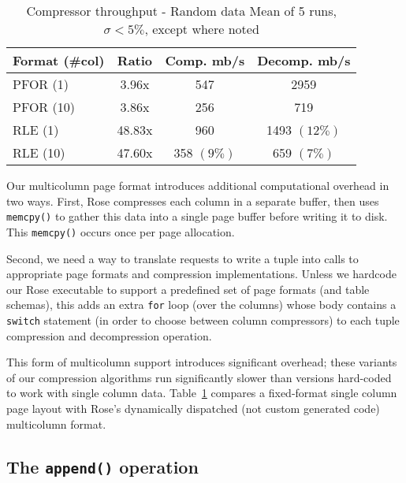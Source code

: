 \documentclass{vldb}
\newcommand{\rows}{Rose\xspace}
\newcommand{\rowss}{Rose's\xspace}
\begin{document}
\begin{table}
\caption{Compressor throughput - Random data Mean of 5 runs, $\sigma<5\%$, except where noted}
\centering
\label{table:perf}
\begin{tabular}{|l|c|c|c|} \hline
Format (\#col)    & Ratio & Comp. mb/s & Decomp. mb/s\\ \hline %
PFOR (1)      &    3.96x  &  547  &    2959 \\ \hline %
PFOR (10)     &    3.86x  &  256 &      719 \\ \hline %
RLE (1)       &   48.83x  &  960  &    1493 $(12\%)$ \\ \hline %
RLE (10)      &   47.60x  &  358 $(9\%)$ & 659 $(7\%)$ \\  %
\hline\end{tabular}
\end{table}


Our multicolumn page format introduces additional computational overhead in two ways.  First,
\rows compresses each column in a separate buffer, then uses {\tt
  memcpy()} to gather this data into a single page buffer before
writing it to disk.  This {\tt memcpy()} occurs once per page
allocation.

Second, we need a way to translate requests to write a tuple into
calls to appropriate page formats and compression implementations.
Unless we hardcode our \rows executable to support a predefined set of
page formats (and table schemas), this adds an extra {\tt for} loop
(over the columns) whose body contains a {\tt switch} statement (in
order to choose between column compressors) to each tuple compression
and decompression operation.

This form of multicolumn support introduces significant overhead;
these variants of our compression algorithms run significantly slower
than versions hard-coded to work with single column data.
Table~\ref{table:perf} compares a fixed-format single column page
layout with \rowss dynamically dispatched (not custom generated code)
multicolumn format.


\subsection{The {\tt \large append()} operation}
\end{document}
